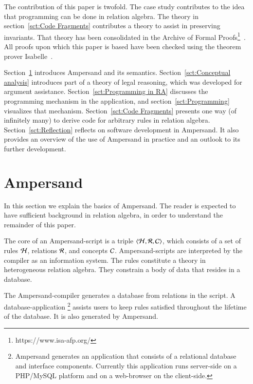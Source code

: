 \documentclass{elsarticle}
\begin{document}
	The contribution of this paper is twofold.
	The case study contributes to the idea that programming can be done in relation algebra.
	The theory in section~\ref{sct:Code Fragments} contributes a theory to assist in preserving invariants.
	That theory has been consolidated in the Archive of Formal Proofs\footnote{https://www.isa-afp.org/}~\cite{Joosten-AFP17}.
	All proofs upon which this paper is based have been checked using the theorem prover Isabelle~\cite{Nipkow2002}.

	Section~\ref{sct:Ampersand} introduces Ampersand and its semantics.
	Section~\ref{sct:Conceptual analysis} introduces part of a theory of legal reasoning,
	which was developed for argument assistance.
	Section~\ref{sct:Programming in RA} discusses the programming mechanism in the application,
	and section~\ref{sct:Programming} visualizes that mechanism.
	Section~\ref{sct:Code Fragments} presents one way (of infinitely many) to derive code for arbitrary rules in relation algebra.
	Section~\ref{sct:Reflection} reflects on software development in Ampersand.
	It also provides an overview of the use of Ampersand in practice and an outlook to its further development.

\section{Ampersand}
\label{sct:Ampersand}
	In this section we explain the basics of Ampersand.
	The reader is expected to have sufficient background in relation algebra,
	in order to understand the remainder of this paper.

	The core of an Ampersand-script is a triple $\langle\mathcal{H},\mathcal{R},\mathcal{C}\rangle$,
	which consists of a set of rules $\mathcal{H}$, relations $\mathcal{R}$, and concepts $\mathcal{C}$.
	Ampersand-scripts are interpreted by the compiler as an information system.
	The rules constitute a theory in heterogeneous relation algebra.
	They constrain a body of data that resides in a database.

	The Ampersand-compiler generates a database from relations in the script.
	A database-application%
\footnote{Ampersand generates an application that consists of a relational database and interface components.
	Currently this application runs server-side on a PHP/MySQL platform and on a web-browser on the client-side.}
	assists users to keep rules satisfied throughout the lifetime of the database. It is also generated by Ampersand.
\end{document}
